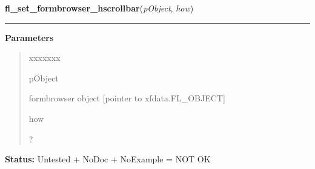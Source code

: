 \hspace{.8\funcindent}\begin{boxedminipage}{\funcwidth}

    \raggedright \textbf{fl\_set\_formbrowser\_hscrollbar}(\textit{pObject}, \textit{how})

    \vspace{-1.5ex}

    \rule{\textwidth}{0.5\fboxrule}
\setlength{\parskip}{2ex}
\setlength{\parskip}{1ex}
      \textbf{Parameters}
      \vspace{-1ex}

      \begin{quote}
        \begin{Ventry}{xxxxxxx}

          \item[pObject]

          formbrowser object [pointer to xfdata.FL\_OBJECT]

          \item[how]

          ?

        \end{Ventry}

      \end{quote}

\textbf{Status:} Untested + NoDoc + NoExample = NOT OK



    \end{boxedminipage}

    \label{xformslib:library:fl_set_formbrowser_vscrollbar}

    \vspace{0.5ex}

